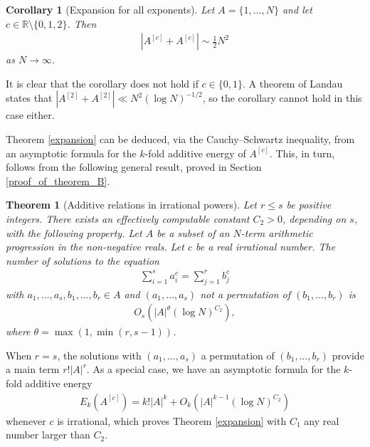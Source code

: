 \documentclass[9pt]{amsart}
\theoremstyle{my_theorem_style}
\numberwithin{definition}{section}
\newtheorem{theorem}[definition]{Theorem}
\newtheorem{corollary}[definition]{Corollary}
\newcommand{\R}{\mathbb{R}}
\begin{document}
\begin{corollary}
[Expansion for all exponents]
\label{expansion_for_all_exponents}
    Let $A = \{1, \dots, N\}$ and let $c \in \R \setminus \{0, 1, 2\}$. Then
    \begin{align*}
        |A^{[c]} + A^{[c]}| \sim \frac{1}{2} N^2
    \end{align*}
    as $N \to \infty$.
\end{corollary}

It is clear that the corollary does not hold if $c \in \{0, 1\}$. A theorem of Landau \cite{Landau_on_the_partition_of_positive_integers_in_four_classes_according_to_the_minimal_number_of_squares_needed_to_their_additive_composition} states that $|A^{[2]} + A^{[2]}| \ll N^2(\log{N})^{-1/2}$, so the corollary cannot hold in this case either.

Theorem \ref{expansion} can be deduced, via the Cauchy--Schwartz inequality, from an asymptotic formula for the $k$-fold additive energy of $A^{[c]}$. This, in turn, follows from the following general result, proved in Section \ref{proof_of_theorem_B}.

\begin{theorem}
[Additive relations in irrational powers]
\label{additive_relations_in_irrational_powers}
    Let $r \leq s$ be positive integers. There exists an effectively computable constant $C_2 > 0$, depending on $s$, with the following property. Let $A$ be a subset of an $N$-term arithmetic progression in the non-negative reals. Let $c$ be a real irrational number. The number of solutions to the equation
    \begin{align}
    \label{additive_relations_in_irrational_powers_equation}
        \sum_{i = 1}^s a_i^c = \sum_{j = 1}^r b_j^c
    \end{align}
    with $a_1, \dots, a_s, b_1, \dots, b_r \in A$ and $(a_1, \dots, a_s)$ not a permutation of $(b_1, \dots, b_r)$ is
    \begin{align*}
        O_s\left(
        |A|^{\theta}(\log N)^{C_2}
        \right),
    \end{align*}
    where $\theta = \max(1, \min(r, s - 1))$.
\end{theorem}

When $r = s$, the solutions with $(a_1, \dots, a_s)$ a permutation of $(b_1, \dots, b_r)$ provide a main term $r! |A|^r$. As a special case, we have an asymptotic formula for the $k$-fold additive energy
\begin{align}
\label{k-fold_energy_asymptotic}
    E_k(A^{[c]}) = k!|A|^k + O_k(|A|^{k - 1}(\log{N})^{C_2})
\end{align}
whenever $c$ is irrational, which proves Theorem \ref{expansion} with $C_1$ any real number larger than $C_2$. 
\end{document}
